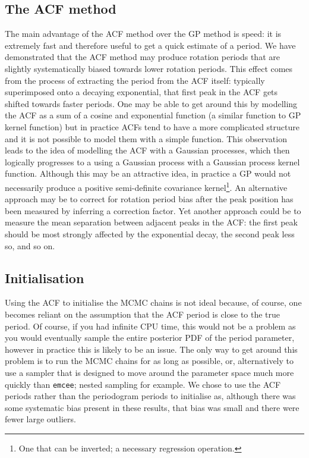 \subsection{The ACF method}
The main advantage of the ACF method over the GP method is speed: it is
extremely fast and therefore useful to get a quick estimate of a period.
We have demonstrated that the ACF method may produce rotation periods that are
slightly systematically biased towards lower rotation periods.
This effect comes from the process of extracting the period from the ACF
itself: typically superimposed onto a decaying exponential, that first peak in
the ACF gets shifted towards faster periods.
One may be able to get around this by modelling the ACF as a sum of a cosine
and exponential function (a similar function to GP kernel function) but
in practice ACFs tend to have a more complicated structure and it is not
possible to model them with a simple function.
This observation leads to the idea of modelling the ACF with a Gaussian
processes, which then logically progresses to a using a Gaussian process with
a Gaussian process kernel function.
Although this may be an attractive idea, in practice a GP would not
necessarily produce a positive semi-definite covariance kernel\footnote{One
that can be inverted; a necessary regression operation.}.
An alternative approach may be to correct for rotation period bias after the
peak position has been measured by inferring a correction factor.
Yet another approach could be to measure the mean separation between adjacent
peaks in the ACF: the first peak should be most strongly affected by the
exponential decay, the second peak less so, and so on.

\subsection{Initialisation}
Using the ACF to initialise the MCMC chains is not ideal because, of course,
one becomes reliant on the assumption that the ACF period is close to the true
period.
Of course, if you had infinite CPU time, this would not be a problem as you
would eventually sample the entire posterior PDF of the period parameter,
however in practice this is likely to be an issue.
The only way to get around this problem is to run the MCMC chains for as long
as possible, or, alternatively to use a sampler that is designed to move
around the parameter space much more quickly than {\tt emcee}; nested sampling
for example.
We chose to use the ACF periods rather than the periodogram periods to
initialise as, although there was some systematic bias present in these
results, that bias was small and there were fewer large outliers.

